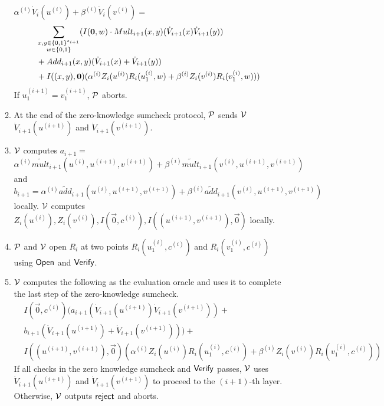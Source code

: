 \begin{mdframed}[nobreak=false]
\begin{construction}
\begin{enumerate}
\begin{enumerate}
				$\alpha^{(i)}\dot{V}_i(u^{(i)})+\beta^{(i)}\dot{V}_i(v^{(i)})=$
				\begin{align*}
				&\sum_{\substack{x, y\in \binary^{s_{i+1}}\\w \in \binary}}(I(\vec{0},w) \cdot Mult_{i+1}(x, y)(\dot{V}_{i+1}(x)\dot{V}_{i+1}(y))\\
				&+Add_{i+1}(x, y)(\dot{V}_{i+1}(x)+\dot{V}_{i+1}(y))\nonumber\\
				&+ I((x, y), \vec{0})(\alpha^{(i)}Z_i(u^{(i)})R_i(u_1^{(i)}, w)+\beta^{(i)}Z_i(v^{(i)})R_i(v_1^{(i)}, w)))
				\end{align*}
				If $u_1^{(i+1)} = v_1^{(i+1)}$, $\P$ aborts.
				
				\item At the end of the zero-knowledge sumcheck protocol, $\P$ sends $\V$ $\dot{V}_{i+1}(u^{(i+1)})$ and $\dot{V}_{i+1}(v^{(i+1)})$.
				
				\item $\V$ computes $a_{i+1} = $\\$\alpha^{(i)}\tilde{mult}_{i+1}(u^{(i)}, u^{(i+1)}, v^{(i+1)})+\beta^{(i)}\tilde{mult}_{i+1}(v^{(i)}, u^{(i+1)}, v^{(i+1)})$ and $b_{i+1} = \alpha^{(i)}\tilde{add}_{i+1}(u^{(i)}, u^{(i+1)}, v^{(i+1)})+\beta^{(i)}\tilde{add}_{i+1}(v^{(i)}, u^{(i+1)}, v^{(i+1)})$ locally. $\V$ computes $Z_i(u^{(i)}),Z_i(v^{(i)}),I(\vec{0},c^{(i)}), I((u^{(i+1)},v^{(i+1)}),\vec{0})$ locally.
				\item $\P$ and $\V$ open $R_i$ at two points $R_i(u_1^{(i)},c^{(i)})$ and $R_i(v_1^{(i)},c^{(i)})$ using $\Open$ and $\Verify$.
				\item $\V$ computes the following as the evaluation oracle and uses it to complete the last step of the zero-knowledge sumcheck.
				{\footnotesize
				\begin{align*}
				&I(\vec{0},c^{(i)})(a_{i+1}(\dot{V}_{i+1}(u^{(i+1)})\dot{V}_{i+1}(v^{(i+1)}))+\\
				&b_{i+1}(\dot{V}_{i+1}(u^{(i+1)})+\dot{V}_{i+1}(v^{(i+1)})))+\\
				&I((u^{(i+1)},v^{(i+1)}),\vec{0})(\alpha^{(i)}Z_i(u^{(i)})R_i(u_1^{(i)}, c^{(i)})+\beta^{(i)}Z_i(v^{(i)})R_i(v_1^{(i)}, c^{(i)}))
				\end{align*}
				}
				If all checks in the zero knowledge sumcheck and $\Verify$ passes, $\V$ uses $\dot{V}_{i+1}(u^{(i+1)})$ and $\dot{V}_{i+1}(v^{(i+1)})$ to proceed to the $(i+1)$-th layer. Otherwise, $\V$ outputs $\reject$ and aborts.
				
			\end{enumerate}
			

\end{enumerate}
\end{construction}
\end{mdframed}
